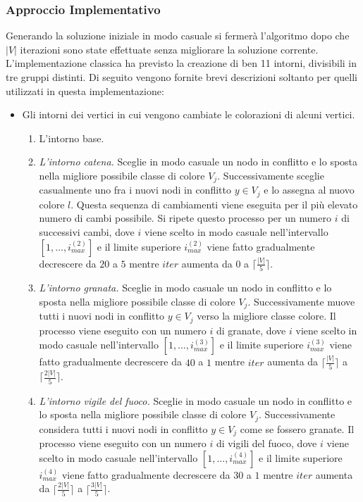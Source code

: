 \documentclass[a4paper,10pt]{article}
\begin{document}
\subsubsection{Approccio Implementativo}
Generando la soluzione iniziale in modo casuale si fermerà l'algoritmo dopo che $|V|$ iterazioni sono state effettuate senza migliorare la soluzione corrente. 
L'implementazione classica ha previsto la creazione di ben 11 intorni, divisibili in tre gruppi distinti. Di seguito vengono fornite brevi descrizioni soltanto per quelli utilizzati in questa implementazione:
\begin{itemize}
 \item Gli intorni dei vertici in cui vengono cambiate le colorazioni di alcuni vertici.
    \begin{enumerate}
        \item L'intorno base.
        \item \emph{L'intorno catena.} Sceglie in modo casuale un nodo in conflitto e lo sposta nella migliore possibile classe di colore $V_{j}$. Successivamente sceglie casualmente uno fra i nuovi nodi in conflitto $y \in V_{j}$ e lo assegna al nuovo colore $l$. Questa sequenza di cambiamenti viene eseguita per il più elevato numero di cambi possibile. Si ripete questo processo per un numero $i$ di successivi cambi, dove $i$ viene scelto in modo casuale nell'intervallo $[1,\ldots,i^{(2)}_{max}]$ e il limite superiore $i^{(2)}_{max}$ viene fatto gradualmente decrescere da $20$ a $5$ mentre $iter$ aumenta da $0$ a $\lceil\frac{|V|}{5}\rceil$.
        
        \item \emph{L'intorno granata.} Sceglie in modo casuale un nodo in conflitto e lo sposta nella migliore possibile classe di colore $V_{j}$. Successivamente muove tutti i nuovi nodi in conflitto $y \in V_{j}$ verso la migliore classe colore. Il processo viene eseguito con un numero $i$ di granate, dove $i$ viene scelto in modo casuale nell'intervallo $[1,\ldots,i^{(3)}_{max}]$ e il limite superiore $i^{(3)}_{max}$ viene fatto gradualmente decrescere da $40$ a $1$ mentre $iter$ aumenta da $\lceil\frac{|V|}{5}\rceil$ a $\lceil\frac{2|V|}{5}\rceil$.
        
        \item \emph{L'intorno vigile del fuoco.} Sceglie in modo casuale un nodo in conflitto e lo sposta nella migliore possibile classe di colore $V_{j}$. Successivamente considera tutti i nuovi nodi in conflitto $y \in V_{j}$ come se fossero granate. Il processo viene eseguito con un numero $i$ di vigili del fuoco, dove $i$ viene scelto in modo casuale nell'intervallo $[1,\ldots,i^{(4)}_{max}]$ e il limite superiore $i^{(4)}_{max}$ viene fatto gradualmente decrescere da $30$ a $1$ mentre $iter$ aumenta da $\lceil\frac{2|V|}{5}\rceil$ a $\lceil\frac{3|V|}{5}\rceil$.
        

\end{enumerate}
\end{itemize}
\end{document}
